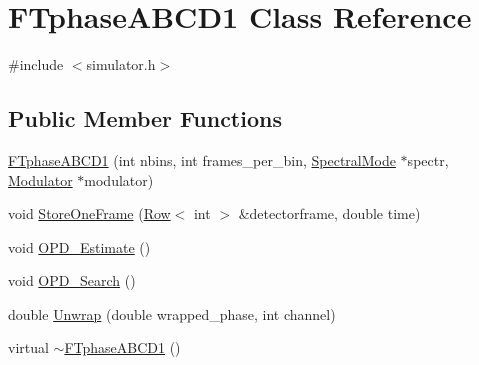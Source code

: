 \hypertarget{classFTphaseABCD1}{
\section{FTphaseABCD1 Class Reference}
\label{classFTphaseABCD1}
}


{\ttfamily \#include $<$simulator.h$>$}

\subsection*{Public Member Functions}
\begin{DoxyCompactItemize}
\item 
\hyperlink{classFTphaseABCD1_a69c82003f09a381dff29cc5efa4ed3ef}{FTphaseABCD1} (int nbins, int frames\_\-per\_\-bin, \hyperlink{classSpectralMode}{SpectralMode} $\ast$spectr, \hyperlink{classModulator}{Modulator} $\ast$modulator)
\item 
void \hyperlink{classFTphaseABCD1_afa8d4ec989b35930c536fd3895eae136}{StoreOneFrame} (\hyperlink{classRow}{Row}$<$ int $>$ \&detectorframe, double time)
\item 
void \hyperlink{classFTphaseABCD1_a2119089560c657b09d77000eecf620ee}{OPD\_\-Estimate} ()
\item 
void \hyperlink{classFTphaseABCD1_aceb9b2e0b45091dadea8c89f67478395}{OPD\_\-Search} ()
\item 
double \hyperlink{classFTphaseABCD1_add33ab3594f5a3059e47dd43ffd9457d}{Unwrap} (double wrapped\_\-phase, int channel)
\item 
virtual \hyperlink{classFTphaseABCD1_af1b4c85c00d3e00c8df0efaa40494754}{$\sim$FTphaseABCD1} ()
\end{DoxyCompactItemize}
